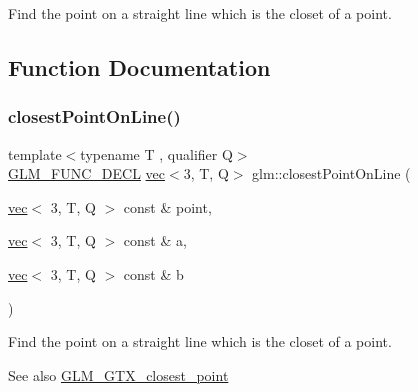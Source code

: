 Find the point on a straight line which is the closet of a point. 

\subsection{Function Documentation}
\mbox{\label{group__gtx__closest__point_ga36529c278ef716986151d58d151d697d}} 
\subsubsection{\texorpdfstring{closest\+Point\+On\+Line()}{closestPointOnLine()}\hspace{0.1cm}{\footnotesize\ttfamily [1/2]}}
{\footnotesize\ttfamily template$<$typename T , qualifier Q$>$ \\
\mbox{\hyperlink{setup_8hpp_ab2d052de21a70539923e9bcbf6e83a51}{G\+L\+M\+\_\+\+F\+U\+N\+C\+\_\+\+D\+E\+CL}} \mbox{\hyperlink{structglm_1_1vec}{vec}}$<$3, T, Q$>$ glm\+::closest\+Point\+On\+Line (\begin{DoxyParamCaption}\item[{\mbox{\hyperlink{structglm_1_1vec}{vec}}$<$ 3, T, Q $>$ const \&}]{point,  }\item[{\mbox{\hyperlink{structglm_1_1vec}{vec}}$<$ 3, T, Q $>$ const \&}]{a,  }\item[{\mbox{\hyperlink{structglm_1_1vec}{vec}}$<$ 3, T, Q $>$ const \&}]{b }\end{DoxyParamCaption})}

Find the point on a straight line which is the closet of a point. \begin{DoxySeeAlso}{See also}
\mbox{\hyperlink{group__gtx__closest__point}{G\+L\+M\+\_\+\+G\+T\+X\+\_\+closest\+\_\+point}} 
\end{DoxySeeAlso}
\mbox{\label{group__gtx__closest__point_ga55bcbcc5fc06cb7ff7bc7a6e0e155eb0}} 
